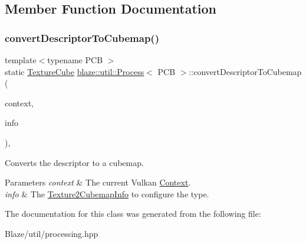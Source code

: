 \subsection{Member Function Documentation}
\mbox{\label{classblaze_1_1util_1_1Process_a56e7bdeca0b7e0af8b8ace326c63d46e}} 
\subsubsection{\texorpdfstring{convert\+Descriptor\+To\+Cubemap()}{convertDescriptorToCubemap()}}
{\footnotesize\ttfamily template$<$typename P\+CB $>$ \\
static \hyperlink{classblaze_1_1TextureCube}{Texture\+Cube} \hyperlink{classblaze_1_1util_1_1Process}{blaze\+::util\+::\+Process}$<$ P\+CB $>$\+::convert\+Descriptor\+To\+Cubemap (\begin{DoxyParamCaption}\item[{const \hyperlink{classblaze_1_1Context}{Context} $\ast$}]{context,  }\item[{const \hyperlink{structblaze_1_1util_1_1Texture2CubemapInfo}{Texture2\+Cubemap\+Info}$<$ P\+CB $>$ \&}]{info }\end{DoxyParamCaption})\hspace{0.3cm}{\ttfamily [inline]}, {\ttfamily [static]}}



Converts the descriptor to a cubemap. 


\begin{DoxyParams}{Parameters}
{\em context} & The current Vulkan \hyperlink{classblaze_1_1Context}{Context}. \\
\hline
{\em info} & The \hyperlink{structblaze_1_1util_1_1Texture2CubemapInfo}{Texture2\+Cubemap\+Info} to configure the type. \\
\hline
\end{DoxyParams}


The documentation for this class was generated from the following file\+:\begin{DoxyCompactItemize}
\item 
Blaze/util/processing.\+hpp\end{DoxyCompactItemize}
